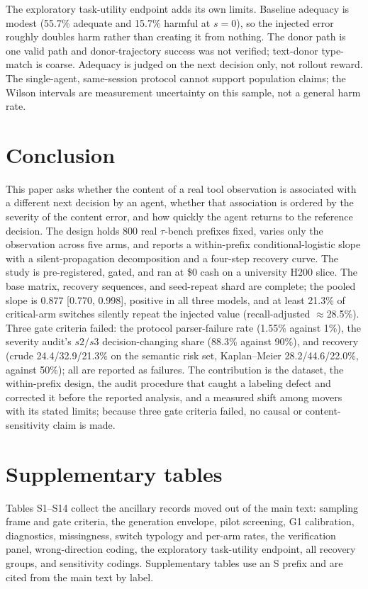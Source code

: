 \documentclass[a4paper,fleqn]{cas-sc}
\begin{document}
The exploratory task-utility endpoint adds its own limits. Baseline adequacy is modest (55.7\%
adequate and 15.7\% harmful at $s=0$), so the injected error roughly doubles harm rather than
creating it from nothing. The donor path is one valid path and donor-trajectory success was not
verified; text-donor type-match is coarse. Adequacy is judged on the next decision only, not
rollout reward. The single-agent, same-session protocol cannot support population claims; the
Wilson intervals are measurement uncertainty on this sample, not a general harm rate.

\section{Conclusion}\label{sec:conclusion}

This paper asks whether the content of a real tool observation is associated with a different
next decision by an agent, whether that association is ordered by the severity of the content
error, and how quickly the agent returns to the reference decision. The design holds 800 real
$\tau$-bench prefixes fixed, varies only the observation across five arms, and reports a
within-prefix conditional-logistic slope with a silent-propagation decomposition and a four-step
recovery curve. The study is pre-registered, gated, and ran at \$0
cash on a university H200 slice. The base matrix, recovery sequences, and seed-repeat shard are
complete; the pooled slope is $0.877$ [0.770, 0.998], positive in all three models, and at least 21.3\% of
critical-arm switches silently repeat the injected value (recall-adjusted $\approx$28.5\%). Three gate criteria failed: the
protocol parser-failure rate
(1.55\% against 1\%), the severity audit's $s2/s3$ decision-changing share (88.3\% against 90\%),
and recovery (crude 24.4/32.9/21.3\% on the semantic risk set, Kaplan--Meier 28.2/44.6/22.0\%, against 50\%); all are reported
as failures. The
contribution is the dataset, the within-prefix design, the audit procedure that caught a labeling
defect and corrected it before the reported analysis, and a measured shift among movers with its
stated limits; because three gate criteria failed, no causal or content-sensitivity claim is made.

\clearpage
\section*{Supplementary tables}\label{sec:supplement}

Tables S1--S14 collect the ancillary records moved out of the main text: sampling frame and
gate criteria, the generation envelope, pilot screening, G1 calibration, diagnostics,
missingness, switch typology and per-arm rates, the verification panel, wrong-direction
coding, the exploratory task-utility endpoint, all recovery groups, and sensitivity codings.
Supplementary tables use an S prefix and are cited from the main text by label.
\end{document}
